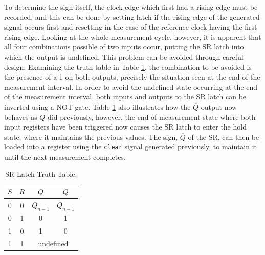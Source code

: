 To determine the sign itself, the clock edge which first had a rising edge must be recorded, and this can be done by setting  latch if the rising edge of the generated signal occurs first and resetting in the case of the reference clock having the first rising edge. Looking at the whole measurement cycle, however, it is apparent that all four combinations possible of two inputs occur, putting the \ac{SR} latch into which the output is undefined. This problem can be avoided through careful design. Examining the truth table in Table \ref{table:sr_tt}, the combination to be avoided is the presence of a 1 on both outputs, precisely the situation seen at the end of the measurement interval. In order to avoid the undefined state occurring at the end of the measurement interval, both inputs and outputs to the \ac{SR} latch can be inverted using a NOT gate. Table \ref{table:sr_tt} also illustrates how the $\overline{Q}$ output now behaves as $Q$ did previously, however, the end of measurement state where both input registers have been triggered now causes the \ac{SR} latch to enter the hold state, where it maintains the previous values. The sign, $\overline{Q}$ of the \ac{SR}, can then be loaded into a register using the \texttt{clear} signal generated previously, to maintain it until the next measurement completes.
\begin{table}[ht]
	\begin{center}
		\begin{tabular}{cc|cc}           
			$S$&$R$&$Q$&$\overline{Q}$\\
			\hline
			0&0&$Q_{n-1}$&$\overline{Q}_{n-1}$\T\\
			0&1&0&1\T\\
			1&0&1&0\T\\
			1&1&\multicolumn{2}{c}{undefined}\T\\					
		\end{tabular}
		\caption[SR Latch Truth Table]{SR Latch Truth Table.}
		\label{table:sr_tt}
	\end{center}
\end{table}

